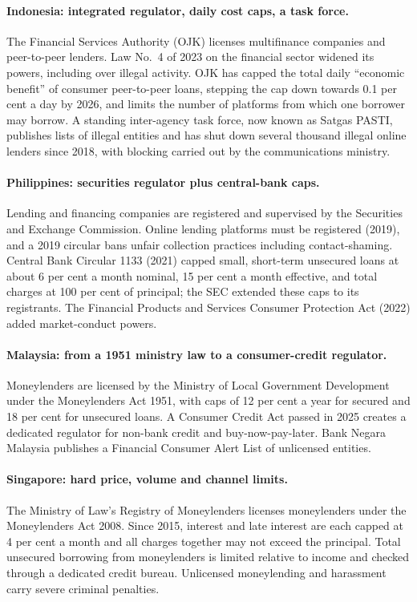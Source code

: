 \documentclass[11pt]{article}
\theoremstyle{plain}
\theoremstyle{definition}
\theoremstyle{remark}
\begin{document}
\paragraph{Indonesia: integrated regulator, daily cost caps, a task force.} The Financial Services Authority (OJK) licenses multifinance companies and peer-to-peer lenders. Law No.~4 of 2023 on the financial sector widened its powers, including over illegal activity. OJK has capped the total daily ``economic benefit'' of consumer peer-to-peer loans, stepping the cap down towards 0.1 per cent a day by 2026, and limits the number of platforms from which one borrower may borrow. A standing inter-agency task force, now known as Satgas PASTI, publishes lists of illegal entities and has shut down several thousand illegal online lenders since 2018, with blocking carried out by the communications ministry.

\paragraph{Philippines: securities regulator plus central-bank caps.} Lending and financing companies are registered and supervised by the Securities and Exchange Commission. Online lending platforms must be registered (2019), and a 2019 circular bans unfair collection practices including contact-shaming. Central Bank Circular 1133 (2021) capped small, short-term unsecured loans at about 6 per cent a month nominal, 15 per cent a month effective, and total charges at 100 per cent of principal; the SEC extended these caps to its registrants. The Financial Products and Services Consumer Protection Act (2022) added market-conduct powers.

\paragraph{Malaysia: from a 1951 ministry law to a consumer-credit regulator.} Moneylenders are licensed by the Ministry of Local Government Development under the Moneylenders Act 1951, with caps of 12 per cent a year for secured and 18 per cent for unsecured loans. A Consumer Credit Act passed in 2025 creates a dedicated regulator for non-bank credit and buy-now-pay-later. Bank Negara Malaysia publishes a Financial Consumer Alert List of unlicensed entities.

\paragraph{Singapore: hard price, volume and channel limits.} The Ministry of Law's Registry of Moneylenders licenses moneylenders under the Moneylenders Act 2008. Since 2015, interest and late interest are each capped at 4 per cent a month and all charges together may not exceed the principal. Total unsecured borrowing from moneylenders is limited relative to income and checked through a dedicated credit bureau. Unlicensed moneylending and harassment carry severe criminal penalties.
\end{document}
